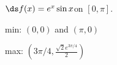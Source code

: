{$\ds f(x) = e^x\sin x$\quad  on \quad $[0,\pi]$.
}
{min: $(0,0)$ and $(\pi,0)$

max: $(3\pi/4,\frac{\sqrt{2}e^{3\pi/4}}{2})$
}
